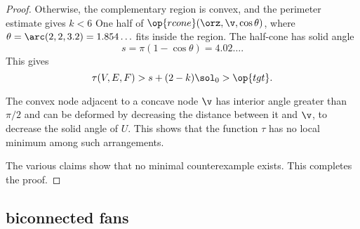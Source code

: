 \begin{proof}
  Otherwise,
the complementary region is convex, and the perimeter estimate gives $k<6$
%
One
half of $\op{rcone}(\orz,\v,\cos\theta)$, where
$\theta=\arc(2,2,3.2)=1.854\ldots$ fits inside the region.  The
half-cone has solid angle
\[
s=\pi(1-\cos\theta)=4.02\ldots.
\]
This gives
\[
\tau(V,E,F) > s + (2-k)\sol_0 > \op{tgt}.
\]
%




The convex node adjacent to a concave node $\v$ has interior angle greater
than $\pi/2$ and can be deformed by decreasing the distance between it
and $\v$, to decrease the solid angle of $U$.  This shows that the
function $\tau$ has no local minimum among such arrangements.
%
%

The various claims show that no minimal counterexample exists.  This
completes the proof.
\end{proof}

\subsection{biconnected fans}

